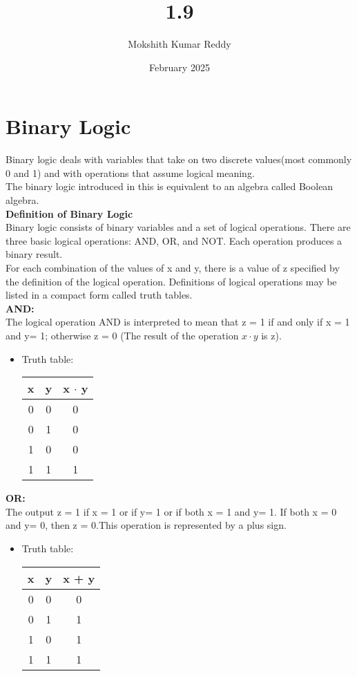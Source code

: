 \documentclass{article}
\title{1.9}
\author{Mokshith Kumar Reddy }
\date{February 2025}
\begin{document}
\maketitle
\section{Binary Logic}
Binary logic deals with variables that take on two discrete values(most commonly 0 and 1) and with operations that assume logical meaning.\\[10pt]
The binary logic introduced in this is equivalent to an algebra called Boolean algebra.\\[10pt]
\textbf{Definition of Binary Logic}\\
Binary logic consists of binary variables and a set of logical operations. There are three basic logical operations: AND, OR, and NOT. Each operation produces a binary result.\\[10pt ]
For each combination of the values of x and y, there is a value of z specified by the
definition of the logical operation. Definitions of logical operations may be listed in a
compact form called truth tables.\\[10pt]
\textbf{AND:}\\[10pt]The logical operation AND is interpreted to mean that z = 1 if and only if x = 1 and y= 1; otherwise z = 0 (The result of the operation $x\cdot y$ is z).
\begin{itemize}
        \item Truth table:
        \begin{tabular}{|c|c|c|}
        \hline
        x & y & x $\cdot$ y \\
        \hline
        0 & 0 & 0 \\
        \hline
        0 & 1 & 0 \\
        \hline
        1 & 0 & 0 \\
        \hline
        1 & 1 & 1 \\
        \hline
        \end{tabular}
\end{itemize}
\textbf{OR:}\\[10pt] The output z = 1 if x = 1 or if y= 1 or if both x = 1
and y= 1. If both x = 0 and y= 0, then z = 0.This operation is represented by a plus sign.\\
\begin{itemize}
        \item Truth table:
        \begin{tabular}{|c|c|c|}
        \hline
        x & y & x + y \\
        \hline
        0 & 0 & 0 \\
        \hline
        0 & 1 & 1 \\
        \hline
        1 & 0 & 1 \\
        \hline
        1 & 1 & 1 \\
        \hline
        \end{tabular}
\end{itemize}
\end{document}
